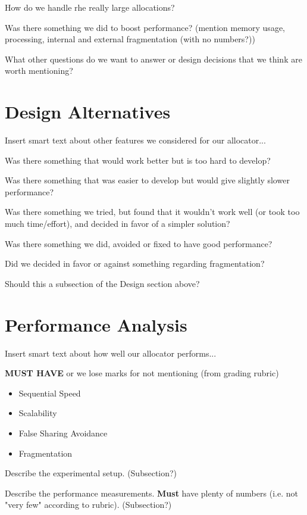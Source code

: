 \documentclass{article}
\begin{document}
How do we handle rhe really large allocations?

Was there something we did to boost performance? (mention memory usage, 
processing, internal and external fragmentation (with no numbers?))

What other questions do we want to answer or design decisions that we think
are worth mentioning?

\newpage
\section{Design Alternatives}
\label{sec:alternatives}

Insert smart text about other features we considered for our allocator...

Was there something that would work better but is too hard to develop?

Was there something that was easier to develop but would give slightly slower
performance?

Was there something we tried, but found that it wouldn't work well (or took too 
much time/effort), and decided in favor of a simpler solution?

Was there something we did, avoided or fixed to have good performance?

Did we decided in favor or against something regarding fragmentation?

Should this a subsection of the Design section above?

\newpage
\section{Performance Analysis}
\label{sec:performance}

Insert smart text about how well our allocator performs...

\textbf{MUST HAVE} or we lose marks for not mentioning (from grading rubric)
\begin{itemize}
	\item Sequential Speed
	\item Scalability
	\item False Sharing Avoidance
	\item Fragmentation
\end{itemize}

Describe the experimental setup. (Subsection?)

Describe the performance measurements. \textbf{Must} have plenty of numbers 
(i.e. not "very few" according to rubric). (Subsection?)
\end{document}
